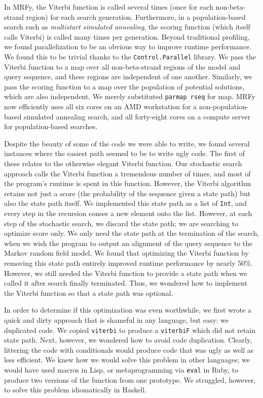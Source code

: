 \documentclass[preprint,nonatbib,blockstyle,nocopyrightspace,times]{sigplanconf}
\begin{document}
In MRFy, the Viterbi function is called several times (once for each 
non-beta-strand region) for each search generation.
Furthermore, in a 
population-based search such as \textit{multistart simulated annealing}, the 
scoring function (which itself calls Viterbi) is called many times per 
generation.
Beyond traditional profiling, we found parallelization to be an 
obvious way to improve runtime performance.
We found this to be trivial thanks 
to the \texttt{Control.Parallel} library.
We pass the Viterbi function to a map over all 
non-beta-strand regions of the model and query sequence, and these regions are 
independent of one another.
Similarly, we pass the scoring function to a map 
over the population of potential solutions, which are also independent.
We 
merely substituted \texttt{parmap rseq} for map.
MRFy now efficiently uses all six 
cores on an AMD workstation for a non-population-based simulated annealing 
search, and all forty-eight cores on a compute server for population-based 
searches.




Despite the beauty of some of the code we were able to write, we found several 
instances where the easiest path seemed to be to write ugly code.
The first of 
these relates to the otherwise elegant Viterbi function.
Our stochastic search 
approach calls the Viterbi function a tremendous number of times, and most of 
the program's runtime is spent in this function.
However, the Viterbi algorithm 
retains not just a score (the probability of the sequence given a state path) 
but also the state path itself.
We implemented this state path as a list of 
\texttt{Int}, and every step in the recursion conses a new element onto the 
list.
However, at each step of the stochastic search, we discard the state 
path; we are searching to optimize score only.
We only need the state path at 
the termination of the search, when we wish the program to output an alignment 
of the query sequence to the Markov random field model.
We found that 
optimizing the Viterbi function by removing this state path entirely improved 
runtime performance by nearly 50\%.
However, we still needed the Viterbi 
function to provide a state path when we called it after search finally 
terminated.
Thus, we wondered how to implement the Viterbi function so that a 
state path was optional.

In order to determine if this optimization was even worthwhile, we first wrote 
a quick and dirty approach that is shameful in any language, but easy: we 
duplicated code.
We copied \texttt{viterbi} to produce a \texttt{viterbiF} 
which did not retain state path.
Next, however, we wondered how to avoid code 
duplication.
Clearly, littering the code with conditionals would produce code 
that was ugly as well as less efficient.
We knew how we would solve this 
problem in other languages; we would have used macros in Lisp, or 
metaprogramming via \texttt{eval} in Ruby, to produce two versions of the 
function from one prototype.
We struggled, however, to solve this problem 
idiomatically in Haskell.
\end{document}

